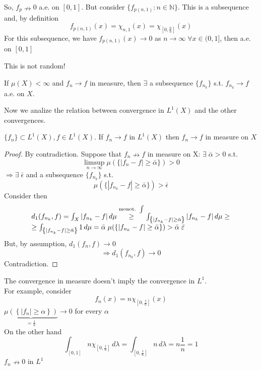 \begin{remark}
    So, \(f_p \nrightarrow 0\) a.e. on \([0,1]\). But consider \( \{ f_{p(n,1)}: n \in \mathbb{N} \} \). 
    This is a subsequence and, by definition 
    \[ 
        f_{p(n, 1)}(x) = \chi_{n, 1}(x)= \chi_{\left[0, \frac{0}{n} \right]}(x) 
    \] 
    For this subsequence, we have \( f_{p(n,1)}(x) \rightarrow 0 \) as \( n \to\infty \; \forall x \in (0, 1] \), then a.e. on \(\left[0, 1\right]\)
    
    This is not random!

\end{remark}

\begin{proposition}
    If \(\mu(X) < \infty \) and \(f_n \rightarrow f \) in measure, then \(\exists\) a subsequence \(\{f_{n_k} \}\) s.t. \(f_{n_k} \to f \) a.e. on \(X\).
\end{proposition}
Now we analize the relation between convergence in \(L^1(X)\) and the other convergences.

\begin{theorem}
    \( \{f_n\} \subset L^1(X), f \in L^1(X) \). If \(f_n \rightarrow f \) in \(L^1(X)\) then \(f_n \rightarrow f \) in measure on \(X\)
\end{theorem}
\begin{proof}
    By contradiction. Suppose that \(f_n \nrightarrow f \) in measure on X: 
    \( \exists \; \bar{\alpha} > 0 \) s.t. 
    \[ 
        \limsup_{n\to\infty} \mu(\{ |f_n-f| \geq \bar{\alpha} \}) > 0 
    \]
    \(\Rightarrow \exists \; \bar{\epsilon}\) and a subsequence \( \{ f_{n_k} \} \) s.t.
    \[ 
        \mu(\{ |f_{n_k}-f| \geq \bar{\alpha} \}) > \bar{\epsilon} 
    \]
    Consider then 
    \[  
        \begin{array}{l}
        d_1(f_{n_k}, f) 
        = \int_X |f_{n_k} - f| \, d\mu  
        \overset{\text{monot. } \int}{\geq} \int_{\left\{|f_{n_k}-f|\geq \bar{\alpha}  \right\}} \abs{f_{n_k} -f} \, d\mu  \geq\\
        \geq \int_{\left\{|f_{n_k}-f|\geq \bar{\alpha}  \right\}} 1 \, d\mu 
        = \bar{\alpha} \; \mu (\{|f_{n_k } - f| \geq \bar{\alpha}\}) 
        > \bar{\alpha} \; \bar{\varepsilon}    
        \end{array}
    \]
    But, by assumption, \(d_1(f_n, f) \rightarrow 0\)
    \[ 
        \Rightarrow d_1(f_{n_k}, f) \rightarrow 0 
    \] 
    Contradiction.
\end{proof}

\begin{remark}
    The convergence in measure doesn't imply the convergence in \(L^1\). \\ For example, consider 
    \[ 
        f_n (x) = n \chi_{\left[0, \frac{1}{n} \right]}(x) 
    \]
    \( \underbrace{\mu \left( \left\{ |f_n| \geq \alpha \right\}\right)}_{= \frac{1}{n}} \to 0 \) for every \(\alpha\) \\
    On the other hand 
    \[ 
        \int _{\left[0, 1\right]} n \chi_{\left[0, \frac{1}{n} \right]} \, d\lambda 
        = \int_{\left[0, \frac{1}{n}\right]} n \, d\lambda 
        = n \frac{1}{n} = 1
    \]
    \( f_n \nrightarrow 0\) in \(L^1\) 
\end{remark}

